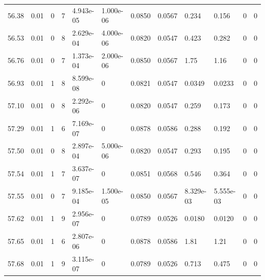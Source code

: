 \documentclass[preview]{standalone}
\begin{document}
{{{{{{{{{{{{{{{\begin{tabular}{L{1.2cm}C{1.2cm} C{0.3cm}C{0.5cm} C{1.4cm}C{1.4cm} C{1.4cm}C{1.4cm} C{1.6cm}C{1.6cm} C{1.6cm}C{1.6cm}}
  56.38  &  0.01  & 0     &  7 &  4.943e-05  & 1.000e-06  &  0.0850&   0.0567& 0.234 & 0.156   &  0 & 0  \\ 
  56.53  &  0.01  & 0     &  8 &  2.629e-04  & 4.000e-06  &  0.0820&   0.0547& 0.423 & 0.282   &  0 & 0  \\ 
  56.76  &  0.01  & 0     &  7 &  1.373e-04  & 2.000e-06  &  0.0850&   0.0567& 1.75 & 1.16   &  0 & 0  \\ 
  56.93  &  0.01  & 1     &  8 &  8.599e-08  & 0  &  0.0821&   0.0547& 0.0349 & 0.0233   &  0 & 0  \\ 
  57.10  &  0.01  & 0     &  8 &  2.292e-06  & 0  &  0.0820&   0.0547& 0.259 & 0.173   &  0 & 0  \\ 
  57.29  &  0.01  & 1     &  6 &  7.169e-07  & 0  &  0.0878&   0.0586& 0.288 & 0.192   &  0 & 0  \\ 
  57.50  &  0.01  & 0     &  8 &  2.897e-04  & 5.000e-06  &  0.0820&   0.0547& 0.293 & 0.195   &  0 & 0  \\ 
  57.54  &  0.01  & 1     &  7 &  3.637e-07  & 0  &  0.0851&   0.0568& 0.546 & 0.364   &  0 & 0  \\ 
  57.55  &  0.01  & 0     &  7 &  9.185e-04  & 1.500e-05  &  0.0850&   0.0567& 8.329e-03 & 5.555e-03   &  0 & 0  \\ 
  57.62  &  0.01  & 1     &  9 &  2.956e-07  & 0  &  0.0789&   0.0526& 0.0180 & 0.0120   &  0 & 0  \\ 
  57.65  &  0.01  & 1     &  6 &  2.807e-06  & 0  &  0.0878&   0.0586& 1.81 & 1.21   &  0 & 0  \\ 
  57.68  &  0.01  & 1     &  9 &  3.115e-07  & 0  &  0.0789&   0.0526& 0.713 & 0.475   &  0 & 0  \\ 
\hline 
\end{tabular} 

}}}}}}}}}}}}}}}
\end{document}
